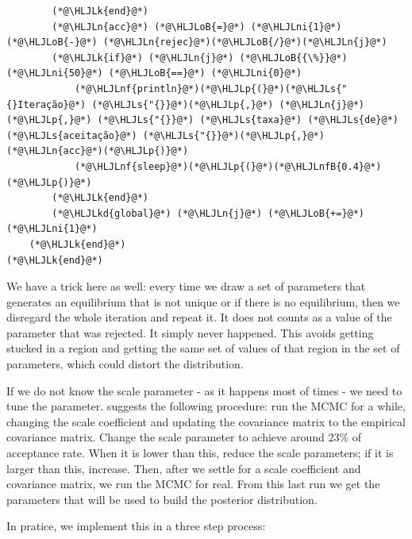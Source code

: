 \documentclass[12pt,a4paper]{article}
\newcommand{\HLJLk}[1]{\textcolor[RGB]{148,91,176}{\textbf{#1}}}
\newcommand{\HLJLkd}[1]{\textcolor[RGB]{214,102,97}{\textit{#1}}}
\newcommand{\HLJLn}[1]{#1}
\newcommand{\HLJLnf}[1]{\textcolor[RGB]{66,102,213}{#1}}
\newcommand{\HLJLs}[1]{\textcolor[RGB]{201,61,57}{#1}}
\newcommand{\HLJLnfB}[1]{\textcolor[RGB]{59,151,46}{#1}}
\newcommand{\HLJLni}[1]{\textcolor[RGB]{59,151,46}{#1}}
\newcommand{\HLJLoB}[1]{\textcolor[RGB]{102,102,102}{\textbf{#1}}}
\newcommand{\HLJLp}[1]{#1}
\begin{document}
\begin{lstlisting}
        (*@\HLJLk{end}@*)
        (*@\HLJLn{acc}@*) (*@\HLJLoB{=}@*) (*@\HLJLni{1}@*) (*@\HLJLoB{-}@*) (*@\HLJLn{rejec}@*)(*@\HLJLoB{/}@*)(*@\HLJLn{j}@*)
        (*@\HLJLk{if}@*) (*@\HLJLn{j}@*) (*@\HLJLoB{{\%}}@*) (*@\HLJLni{50}@*) (*@\HLJLoB{==}@*) (*@\HLJLni{0}@*)
            (*@\HLJLnf{println}@*)(*@\HLJLp{(}@*)(*@\HLJLs{"{}Iteração}@*) (*@\HLJLs{"{}}@*)(*@\HLJLp{,}@*) (*@\HLJLn{j}@*)(*@\HLJLp{,}@*) (*@\HLJLs{"{}}@*) (*@\HLJLs{taxa}@*) (*@\HLJLs{de}@*) (*@\HLJLs{aceitação}@*) (*@\HLJLs{"{}}@*)(*@\HLJLp{,}@*) (*@\HLJLn{acc}@*)(*@\HLJLp{)}@*)
            (*@\HLJLnf{sleep}@*)(*@\HLJLp{(}@*)(*@\HLJLnfB{0.4}@*)(*@\HLJLp{)}@*)
        (*@\HLJLk{end}@*)
        (*@\HLJLkd{global}@*) (*@\HLJLn{j}@*) (*@\HLJLoB{+=}@*) (*@\HLJLni{1}@*)
    (*@\HLJLk{end}@*)
(*@\HLJLk{end}@*)
\end{lstlisting}

We have a trick here as well: every time we draw a set of parameters that generates an equilibrium that is not unique or if there is no equilibrium, then we disregard the whole iteration and repeat it. It does not counts as a value of the parameter that was rejected. It simply never happened. This avoids getting stucked in a region and getting the same set of values of that region in the set of parameters, which could distort the distribution.

If we do not know the scale parameter - as it happens most of times - we need to tune the parameter. \cite{Gelman2014} suggests the following procedure: run the MCMC for a while, changing the scale coefficient and updating the covariance matrix to the empirical covariance matrix. Change the scale parameter to achieve around 23\% of acceptance rate. When it is lower than this, reduce the scale parameters; if it is larger than this, increase. Then, after we settle for a scale coefficient and covariance matrix, we run the MCMC for real. From this last run we get the parameters that will be used to build the posterior distribution.

In pratice, we implement this in a three step process:
\end{document}
